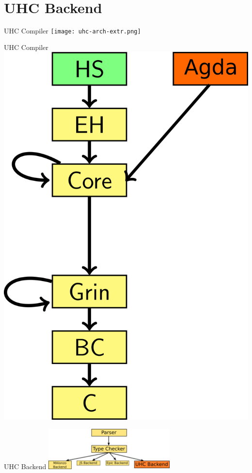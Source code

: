 \section{UHC Backend}

\begin{frame}[fragile]{UHC Compiler}
\texttt{[image: uhc-arch-extr.png]}
\end{frame}

\begin{frame}[fragile]{UHC Compiler}
\includegraphics{uhc-arch-extr-mod.png}
\end{frame}


\begin{frame}[fragile]{UHC Backend}
\includegraphics[width=250px]{agda-arch-with-uhc.png}
\end{frame}


